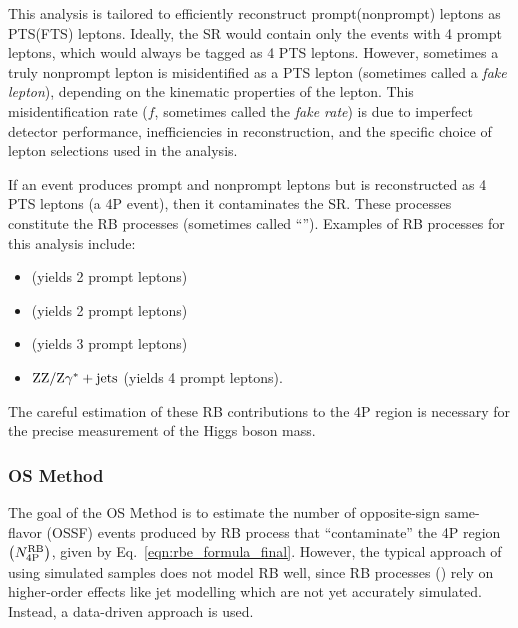 This analysis is tailored to efficiently reconstruct prompt(nonprompt) leptons as PTS(FTS) leptons.
Ideally, the SR would contain only the events with 4 prompt leptons, which would always be tagged as 4 PTS leptons.
However, sometimes a truly nonprompt lepton is misidentified as a PTS lepton (sometimes called a \emph{fake lepton}), depending on the kinematic properties of the lepton.
This misidentification rate ($f$, sometimes called the \emph{fake rate}) is due to imperfect detector performance, inefficiencies in reconstruction, and the specific choice of lepton selections used in the analysis.

If an event produces prompt and nonprompt leptons but is reconstructed as 4 PTS leptons (a 4P event), then it contaminates the SR.
These processes constitute the RB processes (sometimes called ``\ZplusX'').
Examples of RB processes for this analysis include:
\begin{itemize}
	\item \Zplusjets (yields 2 prompt leptons)
	\item \ttbarplusjets (yields 2 prompt leptons)
	\item \WZplusjets (yields 3 prompt leptons)
	\item $\mathrm{Z}\mathrm{Z}/\mathrm{Z}\gamma^\ast + \text{jets}$ (yields 4 prompt leptons).
\end{itemize}
The careful estimation of these RB contributions to the 4P region is necessary for the precise measurement of the Higgs boson mass.

\subsubsection{OS Method}
\label{sec:os_method}
The goal of the OS Method is to estimate the number of opposite-sign same-flavor (OSSF) \fourl events produced by RB process that ``contaminate'' the 4P region $\left( N_\text{4P}^\text{RB} \right)$, given by Eq.~\ref{eqn:rbe_formula_final}.
However, the typical approach of using simulated samples does not model RB well, since RB processes (\eg \Zplusjets) rely on higher-order effects like jet modelling which are not yet accurately simulated.
Instead, a data-driven approach is used.

